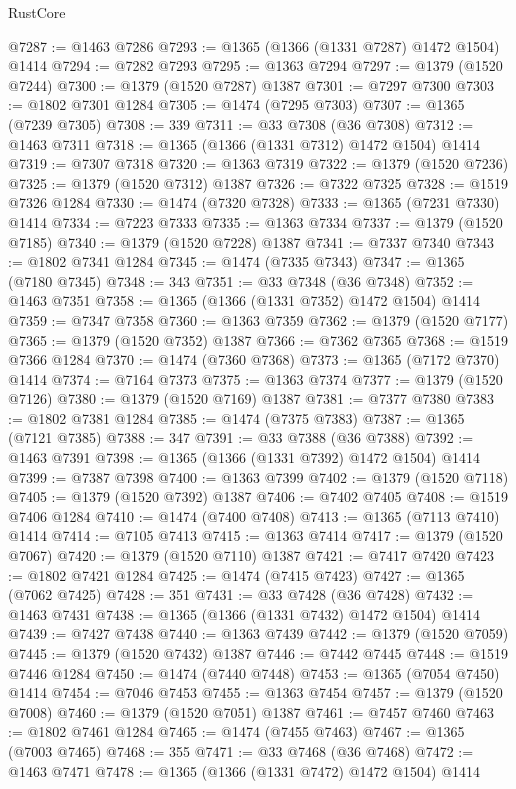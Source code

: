 \begin{lexlean}{RustCore}
\begin{coremodule}
@7287 := @1463 @7286
@7293 := @1365 (@1366 (@1331 @7287) @1472 @1504) @1414
@7294 := @7282 @7293
@7295 := @1363 @7294
@7297 := @1379 (@1520 @7244)
@7300 := @1379 (@1520 @7287) @1387
@7301 := @7297 @7300
@7303 := @1802 @7301 @1284
@7305 := @1474 (@7295 @7303)
@7307 := @1365 (@7239 @7305)
@7308 := 339
@7311 := @33 @7308 (@36 @7308)
@7312 := @1463 @7311
@7318 := @1365 (@1366 (@1331 @7312) @1472 @1504) @1414
@7319 := @7307 @7318
@7320 := @1363 @7319
@7322 := @1379 (@1520 @7236)
@7325 := @1379 (@1520 @7312) @1387
@7326 := @7322 @7325
@7328 := @1519 @7326 @1284
@7330 := @1474 (@7320 @7328)
@7333 := @1365 (@7231 @7330) @1414
@7334 := @7223 @7333
@7335 := @1363 @7334
@7337 := @1379 (@1520 @7185)
@7340 := @1379 (@1520 @7228) @1387
@7341 := @7337 @7340
@7343 := @1802 @7341 @1284
@7345 := @1474 (@7335 @7343)
@7347 := @1365 (@7180 @7345)
@7348 := 343
@7351 := @33 @7348 (@36 @7348)
@7352 := @1463 @7351
@7358 := @1365 (@1366 (@1331 @7352) @1472 @1504) @1414
@7359 := @7347 @7358
@7360 := @1363 @7359
@7362 := @1379 (@1520 @7177)
@7365 := @1379 (@1520 @7352) @1387
@7366 := @7362 @7365
@7368 := @1519 @7366 @1284
@7370 := @1474 (@7360 @7368)
@7373 := @1365 (@7172 @7370) @1414
@7374 := @7164 @7373
@7375 := @1363 @7374
@7377 := @1379 (@1520 @7126)
@7380 := @1379 (@1520 @7169) @1387
@7381 := @7377 @7380
@7383 := @1802 @7381 @1284
@7385 := @1474 (@7375 @7383)
@7387 := @1365 (@7121 @7385)
@7388 := 347
@7391 := @33 @7388 (@36 @7388)
@7392 := @1463 @7391
@7398 := @1365 (@1366 (@1331 @7392) @1472 @1504) @1414
@7399 := @7387 @7398
@7400 := @1363 @7399
@7402 := @1379 (@1520 @7118)
@7405 := @1379 (@1520 @7392) @1387
@7406 := @7402 @7405
@7408 := @1519 @7406 @1284
@7410 := @1474 (@7400 @7408)
@7413 := @1365 (@7113 @7410) @1414
@7414 := @7105 @7413
@7415 := @1363 @7414
@7417 := @1379 (@1520 @7067)
@7420 := @1379 (@1520 @7110) @1387
@7421 := @7417 @7420
@7423 := @1802 @7421 @1284
@7425 := @1474 (@7415 @7423)
@7427 := @1365 (@7062 @7425)
@7428 := 351
@7431 := @33 @7428 (@36 @7428)
@7432 := @1463 @7431
@7438 := @1365 (@1366 (@1331 @7432) @1472 @1504) @1414
@7439 := @7427 @7438
@7440 := @1363 @7439
@7442 := @1379 (@1520 @7059)
@7445 := @1379 (@1520 @7432) @1387
@7446 := @7442 @7445
@7448 := @1519 @7446 @1284
@7450 := @1474 (@7440 @7448)
@7453 := @1365 (@7054 @7450) @1414
@7454 := @7046 @7453
@7455 := @1363 @7454
@7457 := @1379 (@1520 @7008)
@7460 := @1379 (@1520 @7051) @1387
@7461 := @7457 @7460
@7463 := @1802 @7461 @1284
@7465 := @1474 (@7455 @7463)
@7467 := @1365 (@7003 @7465)
@7468 := 355
@7471 := @33 @7468 (@36 @7468)
@7472 := @1463 @7471
@7478 := @1365 (@1366 (@1331 @7472) @1472 @1504) @1414

\end{coremodule}
\end{lexlean}
